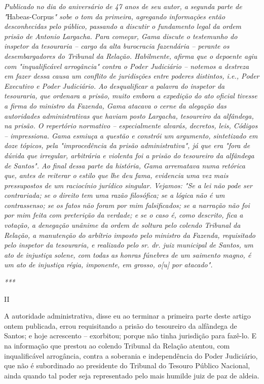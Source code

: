 \emph{Publicado no dia do aniversário de 47 anos de seu autor, a segunda
parte de "}Habeas-Corpus\emph{" sobe o tom da primeira, agregando
informações então desconhecidas pelo público, passando a discutir o
fundamento legal da ordem prisão de Antonio Largacha. Para começar, Gama
discute o testemunho do inspetor da tesouraria -- cargo da alta
burocracia fazendária -- perante os desembargadores do Tribunal da
Relação. Habilmente, afirma que o depoente agiu com "inqualificável
arrogância" contra o Poder Judiciário -- notemos a destreza em fazer
dessa causa um conflito de juridisções entre poderes distintos, i.e.,
Poder Executivo e Poder Judiciário. Ao desqualificar a palavra do
inspetor da tesouraria, que ordenara a prisão, muito embora a expedição
do ato oficial tivesse a firma do ministro da Fazenda, Gama atacava o
cerne da alegação das autoridades administrativas que haviam posto
Largacha, tesoureiro da alfândega, na prisão. O repertório normativo --
especialmente alvarás, decretos, leis, Códigos -- impressiona. Gama
esmiuça a questão e constrói um argumento, sintetizado em doze tópicos,
pela "improcedência da prisão administrativa", já que era "fora de
dúvida que irregular, arbitrária e violenta foi a prisão do tesoureiro
da alfândega de Santos". Ao final dessa parte da história, Gama
arrematava numa retórica que, antes de reiterar o estilo que lhe deu
fama, evidencia uma vez mais pressupostos de um raciocínio jurídico
singular. Vejamos: "Se a lei não pode ser contrariada; se o direito tem
uma razão filosófica; se a lógica não é um contrassenso; se os fatos não
foram por mim falsificados; se a narração não foi por mim feita com
preterição da verdade; e se o caso é, como descrito, fica a votação, a
denegação unânime da ordem de soltura pelo colendo Tribunal da Relação,
a manutenção do arbítrio imposto pelo ministro da Fazenda, requisitado
pelo inspetor da tesouraria, e realizado pelo sr. dr. juiz municipal de
Santos, um ato de injustiça solene, com todas as honras fúnebres de um
saimento magno, é um ato de injustiça régia, imponente, em grosso,
o{[}u{]} por atacado". }

\emph{***}

II

A autoridade administrativa, disse eu ao terminar a primeira parte deste
artigo ontem publicada, errou requisitando a prisão do tesoureiro da
alfândega de Santos; e hoje acrescento -- exorbitou; porque não tinha
jurisdição para fazê-lo. E na informação que prestou ao colendo Tribunal
da Relação atentou, com inqualificável arrogância, contra a soberania e
independência do Poder Judiciário, que não é subordinado ao presidente
do Tribunal do Tesouro Público Nacional, ainda quando tal poder seja
representado pelo mais humilde juiz de paz de aldeia.

